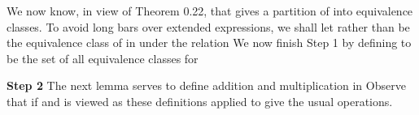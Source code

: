 \documentclass[11pt,oneside]{article}
\begin{document}
\begin{BookBody}
We now know, in view of Theorem 0.22, that \BookInline{\sim } gives a partition of  into equivalence classes. To avoid long bars over extended expressions, we shall let \BookInline{[(a,\allowbreak b)],\allowbreak } rather than  be the equivalence class of  in  under the relation  We now finish Step 1 by defining  to be the set of all equivalence classes \BookInline{[(a,\allowbreak b)]} for 

\textbf{Step 2} The next lemma serves to define addition and multiplication in  Observe that if  and \BookInline{[(a,\allowbreak b)]} is viewed as  these definitions applied to  give the usual operations.

\end{BookBody}

\BookNarrativetrue
\end{document}
